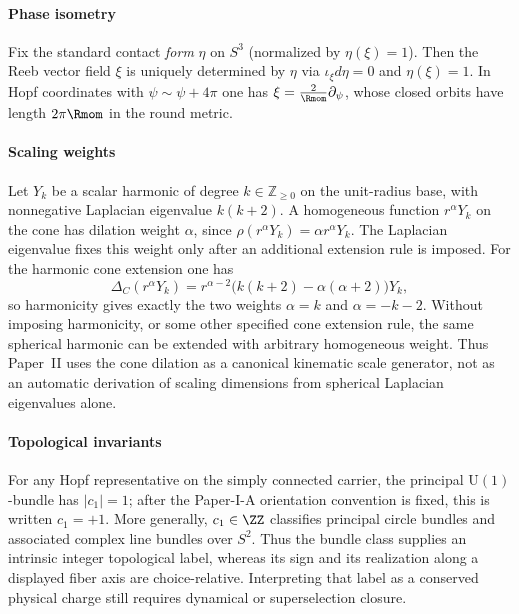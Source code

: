 \documentclass[11pt,a4paper]{article}
\begin{document}
\paragraph{Phase isometry}
Fix the standard contact \emph{form} $\eta$ on $S^3$ (normalized by $\eta(\xi)=1$). Then the Reeb vector field $\xi$ is uniquely determined by $\eta$ via $\iota_\xi d\eta=0$ and $\eta(\xi)=1$.
In Hopf coordinates with $\psi\sim\psi+4\pi$ one has $\xi=\frac{2}{\Rmom}\partial_\psi$, whose closed orbits have length $2\pi\Rmom$ in the round metric.


\paragraph{Scaling weights}
Let \(Y_k\) be a scalar harmonic of degree
\(k\in\mathbb Z_{\ge0}\) on the unit-radius base, with nonnegative Laplacian
eigenvalue \(k(k+2)\).  A homogeneous function $r^\alpha Y_k$ on the cone has dilation weight $\alpha$, since $\rho(r^\alpha Y_k)=\alpha r^\alpha Y_k$.  The Laplacian eigenvalue fixes this weight only after an additional extension rule is imposed.  For the harmonic cone extension one has
\[
\Delta_C(r^\alpha Y_k)=r^{\alpha-2}\bigl(k(k+2)-\alpha(\alpha+2)\bigr)Y_k,
\]
so harmonicity gives exactly the two weights $\alpha=k$ and $\alpha=-k-2$.  Without imposing harmonicity, or some other specified cone extension rule, the same spherical harmonic can be extended with arbitrary homogeneous weight.  Thus Paper~II uses the cone dilation as a canonical kinematic scale generator, not as an automatic derivation of scaling dimensions from spherical Laplacian eigenvalues alone.

\paragraph{Topological invariants}
For any Hopf representative on the simply connected carrier, the principal
$\mathrm{U}(1)$-bundle has $|c_1|=1$; after the Paper-I-A orientation convention
is fixed, this is written $c_1=+1$.  More generally, $c_1\in\ZZ$ classifies
principal circle bundles and associated complex line bundles over $S^2$.
Thus the bundle class supplies an intrinsic integer topological label, whereas
its sign and its realization along a displayed fiber axis are
choice-relative.  Interpreting that label as a conserved physical charge
still requires dynamical or superselection closure.
\end{document}
